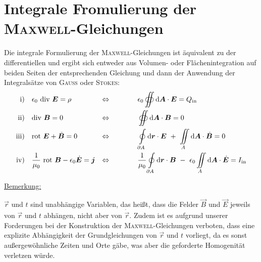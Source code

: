 \section{Integrale Fromulierung der \textsc{Maxwell}-Gleichungen}
Die integrale Formulierung der \textsc{Maxwell}-Gleichungen ist äquivalent zu der differentiellen und ergibt sich entweder aus Volumen- oder Flächenintegration auf beiden Seiten der entsprechenden Gleichung und dann der Anwendung der Integralsätze von \textsc{Gauss} oder \textsc{Stokes}:
\ \\
\begin{align*}
\text{i)} \quad & \epsilon_0 \ \div \vec{E} = \rho & \Leftrightarrow \qquad\qquad & \epsilon_0\oiint \mathrm{d}\vec{A} \cdot\vec{E} = Q_{\text{in}} \\
\text{ii)} \quad & \div\vec{B} = 0 & \Leftrightarrow \qquad\qquad & \oiint \mathrm{d}\vec{A}\cdot\vec{B} = 0 \\
\text{iii)} \quad & \rot \vec{E} + \dot{\vec{B}} = 0 & \Leftrightarrow \qquad\qquad & \oint\limits_{\partial A} \mathrm{d}\vec{r}\cdot\vec{E} \ + \ \iint\limits_A \mathrm{d}\vec{A}\cdot\dot{\vec{B}} = 0 \\
\text{iv)} \quad & \frac{1}{\mu_0} \ \rot \vec{B} - \epsilon_0 \dot{\vec{E}} = \vec{j} & \Leftrightarrow \qquad\qquad & \frac{1}{\mu_0}\oint\limits_{\partial A}\mathrm{d}\vec{r}\cdot\vec{B} \ - \ \epsilon_0\iint\limits_A\mathrm{d}\vec{A}\cdot\dot{\vec{E}} = I_{\text{in}}
\end{align*}

\underline{Bemerkung:}

$\vec{r}$ und $t$ sind unabhängige Variablen, das heißt, dass die Felder $\vec{B}$ und $\vec{E}$ jeweils von $\vec{r}$ und $t$ abhängen, nicht aber von $\dot{\vec{r}}$.
Zudem ist es aufgrund unserer Forderungen bei der Konstruktion der \textsc{Maxwell}-Gleichungen verboten, dass eine explizite Abhängigkeit der Grundgleichungen von $\vec{r}$ und $t$ vorliegt, da es sonst außergewöhnliche Zeiten und Orte gäbe, was aber die geforderte Homogenität verletzen würde.